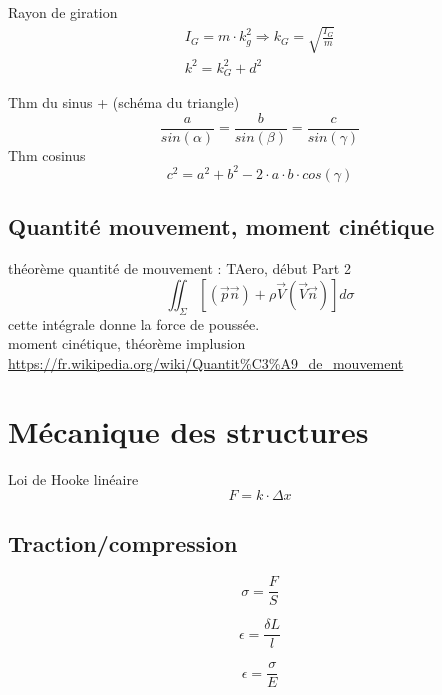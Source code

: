 Rayon de giration
\begin{eqnarray}
I_G=m \cdot k_g^2 \Rightarrow k_G=\sqrt{\frac{I_G}{m}}\\
k^2=k_G^2+d^2
\end{eqnarray}

Thm du sinus + (schéma du triangle)
\begin{equation}
\frac{a}{sin(\alpha)}=\frac{b}{sin(\beta)}=\frac{c}{sin(\gamma)}
\end{equation}
Thm cosinus
\begin{equation}
c^2=a^2+b^2-2 \cdot a \cdot b \cdot cos(\gamma)
\end{equation}

\subsection{Quantité mouvement, moment cinétique}
théorème quantité de mouvement : TAero, début Part 2\\
\begin{equation}
\iint_\Sigma [(\vec{p} \vec{n})+\rho \vec{V}(\vec{V} \vec{n})]d\sigma
\end{equation}
cette intégrale donne la force de poussée. \\
moment cinétique, théorème implusion\\
\url{https://fr.wikipedia.org/wiki/Quantit%C3%A9_de_mouvement}

	
	\newpage
	\section{Mécanique des structures}
	
	Loi de Hooke linéaire
	\begin{equation}
	F=k\cdot \Delta x
	\end{equation}
	
	\subsection{Traction/compression}
	\begin{equation}
	\sigma=\frac{F}{S}
	\end{equation}
	
	\begin{equation}
	\epsilon=\frac{\delta L}{l}
	\end{equation}
	
	\begin{equation}
	\epsilon=\frac{\sigma}{E}
	\end{equation}
	
